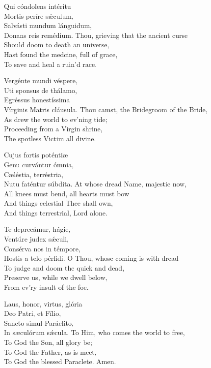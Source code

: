 \setlength{\englishwidth}{0.54\textwidth}
\setlength{\latinwidth}{0.45\textwidth}

Qui cóndolens intéritu\\
Mortis períre sǽculum,\\
Salvásti mundum lánguidum,\\
Donans reis remédium.
\divverse
Thou, grieving that the ancient curse\\
Should doom to death an universe,\\
Hast found the medcine, full of grace,\\
To save and heal a ruin'd race.
\finishverse

Vergénte mundi véspere,\\
Uti sponsus de thálamo,\\
Egréssus honestíssima\\
Vírginis Matris cláusula.
\divverse
Thou camst, the Bridegroom of the Bride,\\
As drew the world to ev’ning tide;\\
Proceeding from a Virgin shrine,\\
The spotless Victim all divine.
\finishverse

Cujus fortis poténtiæ\\
Genu curvántur ómnia,\\
Cæléstia, terréstria,\\
Nutu faténtur súbdita.
\divverse
At whose dread Name, majestic now,\\
All knees must bend, all hearts must bow\\
And things celestial Thee shall own,\\
And things terrestrial, Lord alone.
\finishverse

Te deprecámur, hágie,\\
Ventúre judex sǽculi,\\
Consérva nos in témpore,\\
Hostis a telo pérfidi.
\divverse
O Thou, whose coming is with dread\\
To judge and doom the quick and dead,\\
Preserve us, while we dwell below,\\
From ev'ry insult of the foe.
\finishverse

Laus, honor, virtus, glória\\
Deo Patri, et Fílio,\\
Sancto simul Paráclito,\\
In sæculórum sǽcula.
\divverse
To Him, who comes the world to free,\\
To God the Son, all glory be;\\
To God the Father, as is meet,\\
To God the blessed Paraclete. Amen.
\finishverse

\bigskip



